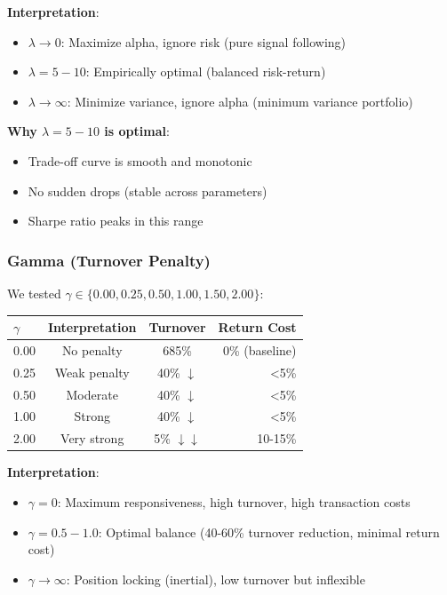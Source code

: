 \documentclass[a4paper,12pt]{article}
\begin{document}
\textbf{Interpretation}:
\begin{itemize}
    \item $\lambda \to 0$: Maximize alpha, ignore risk (pure signal following)
    \item $\lambda = 5-10$: Empirically optimal (balanced risk-return)
    \item $\lambda \to \infty$: Minimize variance, ignore alpha (minimum variance portfolio)
\end{itemize}

\textbf{Why $\lambda=5-10$ is optimal}:
\begin{itemize}
    \item Trade-off curve is smooth and monotonic
    \item No sudden drops (stable across parameters)
    \item Sharpe ratio peaks in this range
\end{itemize}

\subsubsection{Gamma (Turnover Penalty)}

We tested $\gamma \in \{0.00, 0.25, 0.50, 1.00, 1.50, 2.00\}$:

\begin{table}[H]
\centering
\begin{tabular}{lccr}
\toprule
\textbf{$\gamma$} & \textbf{Interpretation} & \textbf{Turnover} & \textbf{Return Cost} \\
\midrule
0.00 & No penalty & 685\% & 0\% (baseline) \\
0.25 & Weak penalty & 40\% $\downarrow$ & <5\% \\
0.50 & Moderate & 40\% $\downarrow$ & <5\% \\
1.00 & Strong & 40\% $\downarrow$ & <5\% \\
2.00 & Very strong & 5\% $\downarrow\downarrow$ & 10-15\% \\
\bottomrule
\end{tabular}
\end{table}

\textbf{Interpretation}:
\begin{itemize}
    \item $\gamma = 0$: Maximum responsiveness, high turnover, high transaction costs
    \item $\gamma = 0.5-1.0$: Optimal balance (40-60\% turnover reduction, minimal return cost)
    \item $\gamma \to \infty$: Position locking (inertial), low turnover but inflexible
\end{itemize}
\end{document}
